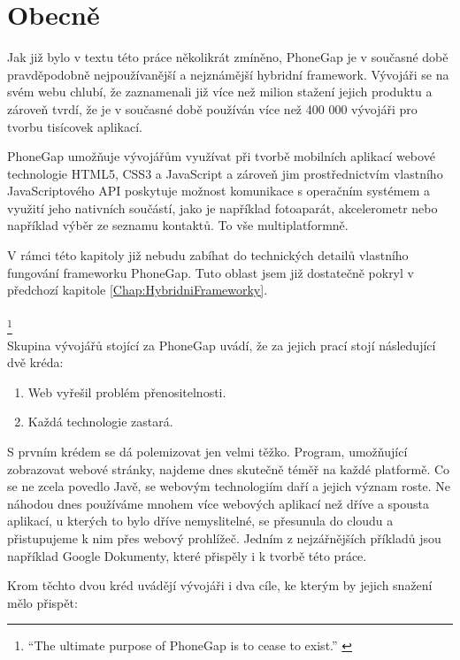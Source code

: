\section{Obecně}
Jak již bylo v textu této práce několikrát zmíněno, PhoneGap je v současné době pravděpodobně nejpoužívanější a nejznámější hybridní framework. Vývojáři se na svém webu chlubí, že zaznamenali již více než milion stažení jejich produktu a zároveň tvrdí, že je v současné době používán více než 400 000 vývojáři pro tvorbu tisícovek aplikací.

PhoneGap umožňuje vývojářům využívat při tvorbě mobilních aplikací webové technologie HTML5, CSS3 a JavaScript a zároveň jim prostřednictvím vlastního JavaScriptového API poskytuje možnost komunikace s operačním systémem a využití jeho nativních součástí, jako je například fotoaparát, akcelerometr nebo například výběr ze seznamu kontaktů. To vše multiplatformně.

V rámci této kapitoly již nebudu zabíhat do technických detailů vlastního fungování frameworku PhoneGap. Tuto oblast jsem již dostatečně pokryl v předchozí kapitole \ref{Chap:HybridniFrameworky}.\\ \\

\textit{ \cite{how_cordova_becomes_phonegap}}
\footnote{“The ultimate purpose of PhoneGap is to cease to exist.” \cite{how_cordova_becomes_phonegap}} \\

Skupina vývojářů stojící za PhoneGap uvádí, že za jejich prací stojí následující dvě kréda:

\begin{enumerate}
	\item Web vyřešil problém přenositelnosti.
	\item Každá technologie zastará.
\end{enumerate}

S prvním krédem se dá polemizovat jen velmi těžko. Program, umožňující zobrazovat webové stránky, najdeme dnes skutečně téměř na každé platformě. Co se ne zcela povedlo Javě, se webovým technologiím daří a jejich význam roste. Ne náhodou dnes používáme mnohem více webových aplikací než dříve a spousta aplikací, u kterých to bylo dříve nemyslitelné, se přesunula do cloudu a přistupujeme k nim přes webový prohlížeč. Jedním z nejzářnějších příkladů jsou například Google Dokumenty, které přispěly i k tvorbě této práce.

Krom těchto dvou kréd uvádějí vývojáři i dva cíle, ke kterým by jejich snažení mělo přispět:

